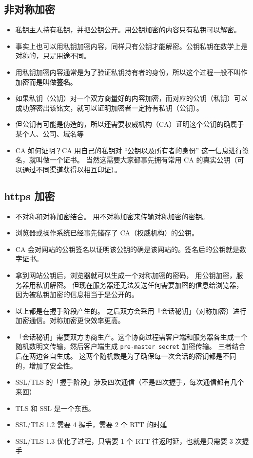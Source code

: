 
\subsection{非对称加密}
\begin{itemize}
\item 私钥主人持有私钥，并把公钥公开。用公钥加密的内容只有私钥可以解密。
\item 事实上也可以用私钥加密内容，同样只有公钥才能解密。公钥私钥在数学上是对称的，只是用途不同。
\item 用私钥加密内容通常是为了验证私钥持有者的身份，所以这个过程一般不叫作加密而是叫做\textbf{签名}。
\item 如果私钥（公钥）对一个双方商量好的内容加密，而对应的公钥（私钥）可以成功解密出该铭文，就可以证明加密者一定持有私钥（公钥）。
\item 但公钥有可能是伪造的，所以还需要权威机构（CA）证明这个公钥的确属于某个人、公司、域名等
\item CA 如何证明？CA 用自己的私钥对 “公钥以及所有者的身份” 这一信息进行签名，就叫做一个证书。 当然这需要大家都事先拥有常用 CA 的真实公钥（可以通过不同渠道获得以相互印证）。
\end{itemize}

\subsection{https 加密}
\begin{itemize}
\item 不对称和对称加密结合。 用不对称加密来传输对称加密的密钥。
\item 浏览器或操作系统已经事先储存了 CA（权威机构）的公钥。
\item CA 会对网站的公钥签名以证明该公钥的确是该网站的。签名后的公钥就是数字证书。
\item 拿到网站公钥后，浏览器就可以生成一个对称加密的密码， 用公钥加密，服务器用私钥解密。 但现在服务器还无法发送任何需要加密的信息给浏览器，因为被私钥加密的信息相当于是公开的。
\item 以上都是在握手阶段产生的。 之后双方会采用「会话秘钥」（对称加密）进行加密通信。对称加密更快效率更高。
\item 「会话秘钥」需要双方协商生产。这个协商过程需客户端和服务器各生成一个随机数明文传输，然后客户端生成 \verb`pre-master secret` 加密传输。 三者结合后在两边各自生成。 这两个随机数是为了确保每一次会话的密钥都是不同的，增加了安全性。
\item SSL/TLS 的「握手阶段」涉及四次通信（不是四次握手，每次通信都有几个来回）
\item TLS 和 SSL 是一个东西。
\item SSL/TLS 1.2 需要 4 握手，需要 2 个 RTT 的时延
\item SSL/TLS 1.3 优化了过程，只需要 1 个 RTT 往返时延，也就是只需要 3 次握手
\end{itemize}
